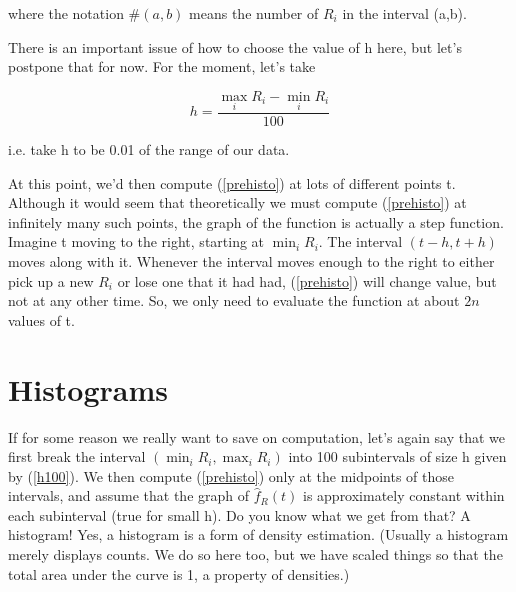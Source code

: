 where the notation $\#(a,b)$ means the number of $R_i$ in the interval
(a,b).

There is an important issue of how to choose the value of h here, but
let's postpone that for now.  For the moment, let's take 

\begin{equation}
\label{h100}
h = \frac{\max_i R_i - \min_iR_i}{100}
\end{equation}

i.e. take h to be 0.01 of the range of our data.

At this point, we'd then compute (\ref{prehisto}) at lots of different
points t.  Although it would seem that theoretically we must compute
(\ref{prehisto}) at infinitely many such points, the graph of the
function is actually a step function.  Imagine t moving to the right,
starting at $\min_iR_i$.  The interval $(t-h,t+h)$ moves along with it.
Whenever the interval moves enough to the right to either pick up a new
$R_i$ or lose one that it had had,  (\ref{prehisto}) will change value,
but not at any other time.  So, we only need to evaluate the function at
about $2n$ values of t.

\section{Histograms} 

If for some reason we really want to save on computation, let's again
say that we first break the interval $(\min_iR_i, \max_iR_i)$ into 100
subintervals of size h given by (\ref{h100}).  We then compute
(\ref{prehisto}) only at the midpoints of those intervals, and assume
that the graph of $\widehat{f}_R(t)$ is approximately constant within
each subinterval (true for small h).  Do you know what we get from that?
A histogram!  Yes, a histogram is a form of density estimation.
(Usually a histogram merely displays counts.  We do so here too, but we
have scaled things so that the total area under the curve is 1, a
property of densities.)

% 
% 
% 
% 
% 
% 
% 
% 

